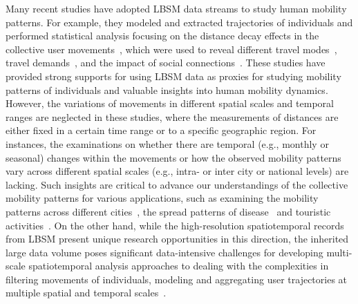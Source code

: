 \documentclass[ijgi,article,submit,moreauthors,pdftex,10pt,a4paper]{mdpi}
\theoremstyle{mdpi}
\newcounter{ex}
\newcounter{re}
\theoremstyle{mdpidefinition}
\begin{document}
Many recent studies have adopted LBSM data streams to study human mobility patterns.
For example, they modeled and extracted trajectories of individuals and performed statistical analysis focusing on the distance decay effects in the collective user movements~\cite{gonzalez2008understanding}, which were used to reveal different travel modes~\cite{Jurdak2015}, travel demands~\cite{wu2014intra,hasan2013understanding}, and the impact of social connections~\cite{cho2011friendship}.
These studies have provided strong supports for using LBSM data as proxies for studying mobility patterns of individuals and valuable insights into human mobility dynamics.
However, the variations of movements in different spatial scales and temporal ranges are neglected in these studies, where the measurements of distances are either fixed in a certain time range or to a specific geographic region.
For instances, the examinations on whether there are temporal (e.g., monthly or seasonal) changes within the movements or how the observed mobility patterns vary across different spatial scales (e.g., intra- or inter city or national levels) are lacking.
Such insights are critical to advance our understandings of the collective mobility patterns for various applications, such as examining the mobility patterns across different cities~\cite{noulas2012tale}, the spread patterns of disease~\cite{balcan2009multiscale, tamerius2011global} and touristic activities~\cite{hawelka2014geo}.
On the other hand, while the high-resolution spatiotemporal records from LBSM present unique research opportunities in this direction, the inherited large data volume poses significant data-intensive challenges for developing multi-scale spatiotemporal analysis approaches to dealing with the complexities in filtering movements of individuals, modeling and aggregating user trajectories at multiple spatial and temporal scales~\cite{tsou2015}.
\end{document}
